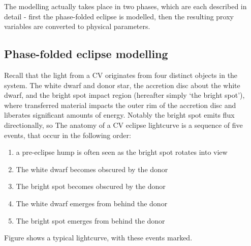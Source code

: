 The modelling actually takes place in two phases, which are each described in detail - first the phase-folded eclipse is modelled, then the resulting proxy variables are converted to physical parameters. 

\subsection{Phase-folded eclipse modelling}
\label{sect:modelling:eclipse modelling}

Recall that the light from a CV originates from four distinct objects in the system. The white dwarf and donor star, the accretion disc about the white dwarf, and the bright spot impact region (hereafter simply `the bright spot'), where transferred material impacts the outer rim of the accretion disc and liberates significant amounts of energy. Notably the bright spot emits flux directionally, so
The anatomy of a CV eclipse lightcurve is a sequence of five events, that occur in the following order:
\begin{enumerate}
    \item a pre-eclipse hump is often seen as the bright spot rotates into view
    \item The white dwarf becomes obscured by the donor
    \item The bright spot becomes obscured by the donor
    \item The white dwarf emerges from behind the donor
    \item The bright spot emerges from behind the donor
\end{enumerate}
Figure shows a typical lightcurve, with these events marked.

